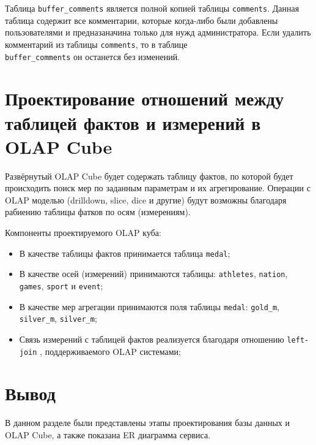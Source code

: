 Таблица \texttt{buffer\_comments} является полной копией таблицы \texttt{comments}. Данная таблица содержит все комментарии, которые когда-либо были добавлены пользователями и предназаначина только для нужд администратора. Если удалить комментарий из таблицы  \texttt{comments}, то в таблице \\  \texttt{buffer\_comments} он останется без изменений.

\section{Проектирование отношений между таблицей фактов и измерений  в OLAP Cube}

Развёрнутый OLAP Cube будет содержать таблицу фактов, по которой будет происходить поиск мер по заданным параметрам и  их агрегирование. Операции с OLAP моделью (drilldown, slice, dice и другие) будут возможны благодаря рабиению таблицы фатков по осям (измерениям).

\newpage
Компоненты проектируемого OLAP куба:

\begin{itemize}
	
	\item  В качестве таблицы фактов \cite{cube-operations} принимается таблица \texttt{medal};
	
	\item  В качестве осей (измерений)  \cite{cube-operations} принимаются таблицы: \texttt{athletes}, \texttt{nation}, \texttt{games}, \texttt{sport} и \texttt{event};
	
	\item  В качестве мер агрегации  \cite{cube-operations} принимаются поля таблицы \texttt{medal}: \texttt{gold\_m}, \texttt{silver\_m}, \texttt{silver\_m};
	
	\item  Связь измерений с таблицей фактов реализуется благодаря отношению \texttt{left-join} \cite{cube-schemas}, поддерживаемого OLAP системами;
	
\end{itemize}


\section*{Вывод}

В данном разделе были представлены этапы проектирования базы данных и OLAP Cube, а также показана ER диаграмма сервиса.


